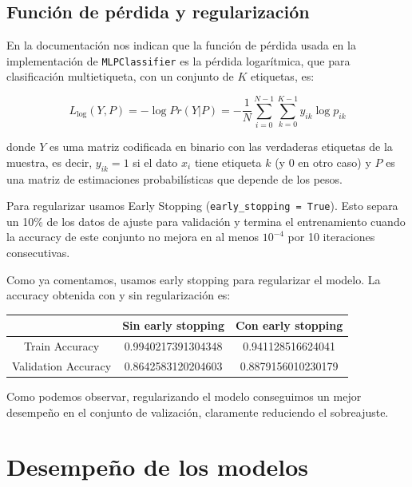 \documentclass[a4]{article}
\begin{document}
\subsection{Función de pérdida y regularización}

En la documentación nos indican que la función de pérdida usada en la
implementación de \texttt{MLPClassifier} es la pérdida logarítmica,
que para clasificación multietiqueta, con un conjunto de $K$
etiquetas, es:

\[ L_{\log}(Y,P) = -\log Pr(Y|P) = -\frac{1}{N}\sum\limits_{i=0}^{N-1}\sum\limits_{k=0}^{K-1} y_{ik}\log p_{ik}\]

donde $Y$ es uma matriz codificada en binario con las verdaderas
etiquetas de la muestra, es decir, $y_{ik} = 1$ si el dato $x_i$ tiene
etiqueta $k$ (y $0$ en otro caso) y $P$ es una matriz de estimaciones
probabilísticas que depende de los pesos.

Para regularizar usamos Early Stopping (\texttt{early\_stopping =
  True}). Esto separa un 10\% de los datos de ajuste para validación y
termina el entrenamiento cuando la accuracy de este conjunto no mejora
en al menos $10^{-4}$ por 10 iteraciones consecutivas.

Como ya comentamos, usamos early stopping para regularizar el modelo. La accuracy obtenida con y sin regularización es:

\begin{center}
\begin{tabular}{|c|c|c|}
  \hline
  \multicolumn{1}{|c|}{}& \textbf{Sin early stopping} &
                                                                       \textbf{Con early stopping}  \\ \hline
  Train Accuracy      & 0.9940217391304348 & 0.941128516624041 \\
  Validation Accuracy & 0.8642583120204603 &  0.8879156010230179 \\ \hline
\end{tabular}
\end{center}

Como podemos observar, regularizando el modelo conseguimos un mejor desempeño en el conjunto de valización, claramente reduciendo el sobreajuste.

\section{Desempeño de los modelos}
\end{document}
